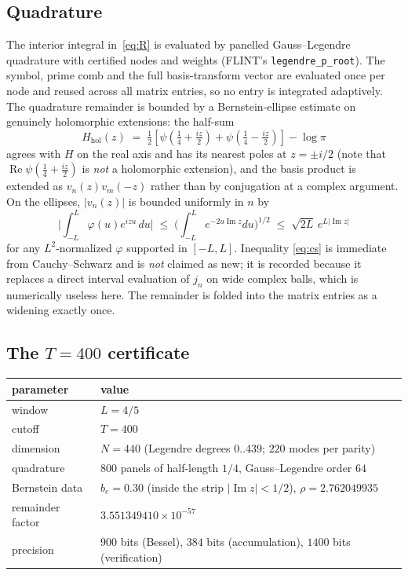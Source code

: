 \documentclass[11pt,a4paper]{article}
\theoremstyle{definition}
\theoremstyle{remark}
\newcommand{\src}[1]{{\footnotesize\texttt{#1}}}
\begin{document}
\subsection{Quadrature}

The interior integral in~\eqref{eq:R} is evaluated by panelled
Gauss--Legendre quadrature with certified nodes and weights (FLINT's
\src{legendre\_p\_root}). The symbol, prime comb and the full basis-transform
vector are evaluated once per node and reused across all matrix entries, so no
entry is integrated adaptively. The quadrature remainder is bounded by a
Bernstein-ellipse estimate on genuinely holomorphic extensions: the half-sum
\[
   H_{\mathrm{hol}}(z) \;=\; \tfrac12\left[
     \psi\!\left(\tfrac14 + \tfrac{iz}{2}\right)
   + \psi\!\left(\tfrac14 - \tfrac{iz}{2}\right)\right] - \log\pi
\]
agrees with $H$ on the real axis and has its nearest poles at $z = \pm i/2$
(note that $\operatorname{Re}\psi(\frac14 + \frac{iz}{2})$ is \emph{not} a
holomorphic extension), and the basis product is extended as $v_n(z)v_m(-z)$
rather than by conjugation at a complex argument. On the ellipses, $|v_n(z)|$ is
bounded uniformly in $n$ by
\begin{equation}
\label{eq:cs}
   \Big|\int_{-L}^{L}\varphi(u) e^{izu}\,du\Big|
   \;\le\; \Big(\int_{-L}^{L} e^{-2u \operatorname{Im} z}du\Big)^{1/2}
   \;\le\; \sqrt{2L}\, e^{L|\operatorname{Im} z|}
\end{equation}
for any $L^2$-normalized $\varphi$ supported in $[-L,L]$. Inequality
\eqref{eq:cs} is immediate from Cauchy--Schwarz and is \emph{not} claimed as
new; it is recorded because it replaces a direct interval evaluation of
$j_n$ on wide complex balls, which is numerically useless here. The remainder is
folded into the matrix entries as a widening exactly once.

\subsection{The $T = 400$ certificate}

\begin{center}
\begin{tabular}{ll}
\toprule
parameter & value \\
\midrule
window & $L = 4/5$ \\
cutoff & $T = 400$ \\
dimension & $N = 440$ (Legendre degrees $0..439$; $220$ modes per parity) \\
quadrature & $800$ panels of half-length $1/4$, Gauss--Legendre order $64$ \\
Bernstein data & $b_e = 0.30$ (inside the strip $|\operatorname{Im} z| < 1/2$), $\rho = 2.762049935$ \\
remainder factor & $3.551349410\times10^{-57}$ \\
precision & $900$ bits (Bessel), $384$ bits (accumulation), $1400$ bits (verification) \\
\bottomrule
\end{tabular}
\end{center}
\end{document}
